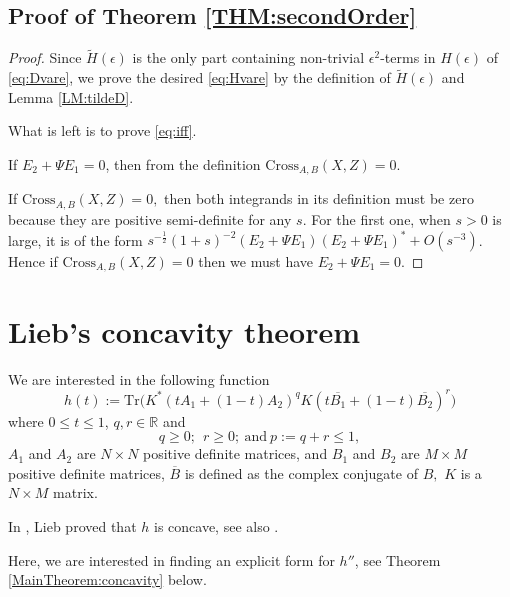 \documentclass{article}
\numberwithin{equation}{section}
\begin{document}
\subsection{Proof of Theorem \ref{THM:secondOrder}}
\begin{proof}
Since $\tilde{H}(\epsilon)$ is the only part containing non-trivial $\epsilon^2$-terms in $H(\epsilon)$ of \eqref{eq:Dvare}, we prove the desired \eqref{eq:Hvare} by the definition of $\tilde{H}(\epsilon)$ and Lemma \ref{LM:tildeD}.

What is left is to prove \eqref{eq:iff}. 

If $E_2+\Psi E_1=0$, then from the definition $\text{Cross}_{A,B}(X,Z)=0.$ 

If $\text{Cross}_{A,B}(X,Z)=0,$ then both integrands in its definition must be zero because they are positive semi-definite for any $s$. For the first one, when $s>0$ is large, it is of the form $s^{-\frac{1}{2}}(1+s)^{-2} (E_2+\Psi E_1) (E_2+\Psi E_1)^{*}+O(s^{-3})$. Hence if $\text{Cross}_{A,B}(X,Z)=0$ then we must have $E_2+\Psi E_1=0.$
\end{proof}


\section{Lieb's concavity theorem}\label{sec:convexity}
We are interested in the following function
\begin{equation}\label{def:ft}
   h(t) := \text{Tr} \big(K^* (tA_1 + (1-t)A_2)^q K (t\overline{B_1} + (1-t)\overline{B_2})^r\big)
\end{equation} where $0 \leq t \leq 1$, $q,r\in \mathbb{R}$ and \begin{equation}\label{eq:qrPair}
q\geq 0;\ \ r\geq 0;\ \text{and}\ p:=q+r\leq 1,
\end{equation}
$A_1$ and $A_2$ are $N\times N$ positive definite matrices, and $B_1$ and $B_2$ are $M\times M$ positive definite matrices, $\overline{B}$ is defined as the complex conjugate of $B,$ $K$ is a $N\times M$ matrix.


In \cite{LIEB1973267}, Lieb proved that $h$ is concave, see also \cite{Epstein1973, carlen2010trace}. 

Here, we are interested in finding an explicit form for $h''$, see Theorem \ref{MainTheorem:concavity} below.
\end{document}
